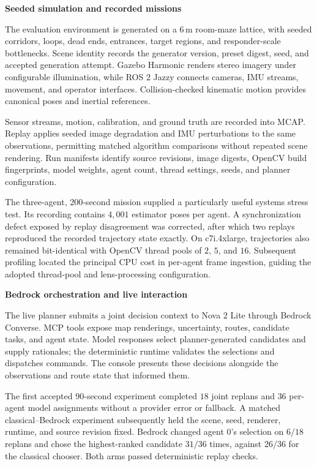 \documentclass[10pt,a4paper]{article}
\newcommand{\indentedheading}[1]{\par\addvspace{0.65em}\noindent\hspace*{1em}\textbf{#1}\par\smallskip}
\begin{document}
\indentedheading{Seeded simulation and recorded missions}

The evaluation environment is generated on a $6$\,m
room-maze lattice, with seeded corridors, loops, dead ends,
entrances, target regions, and responder-scale bottlenecks.
Scene identity records the generator version, preset digest,
seed, and accepted generation attempt. Gazebo Harmonic renders
stereo imagery under configurable illumination, while ROS 2
Jazzy connects cameras, IMU streams, movement, and operator
interfaces. Collision-checked kinematic motion provides
canonical poses and inertial references.

Sensor streams, motion, calibration, and ground truth are
recorded into MCAP. Replay applies seeded image degradation
and IMU perturbations to the same observations, permitting
matched algorithm comparisons without repeated scene rendering.
Run manifests identify source revisions, image digests,
OpenCV build fingerprints, model weights, agent count,
thread settings, seeds, and planner configuration.

The three-agent, $200$-second mission supplied a particularly
useful systems stress test. Its recording contains $4{,}001$
estimator poses per agent. A synchronization defect exposed
by replay disagreement was corrected, after which two
replays reproduced the recorded trajectory state exactly.
On c7i.4xlarge, trajectories also remained bit-identical
with OpenCV thread pools of $2$, $5$, and $16$.
Subsequent profiling located the principal CPU cost in
per-agent frame ingestion, guiding the adopted thread-pool
and lens-processing configuration.

\indentedheading{Bedrock orchestration and live interaction}

The live planner submits a joint decision context to Nova
2 Lite through Bedrock Converse. MCP tools expose map
renderings, uncertainty, routes, candidate tasks, and agent
state. Model responses select planner-generated candidates
and supply rationales; the deterministic runtime validates
the selections and dispatches commands. The console presents
these decisions alongside the observations and route state
that informed them.

The first accepted $90$-second experiment completed
$18$ joint replans and $36$ per-agent model assignments
without a provider error or fallback. A matched
classical--Bedrock experiment subsequently held the scene,
seed, renderer, runtime, and source revision fixed.
Bedrock changed agent 0's selection on $6/18$ replans
and chose the highest-ranked candidate $31/36$ times,
against $26/36$ for the classical chooser. Both arms
passed deterministic replay checks.
\end{document}
